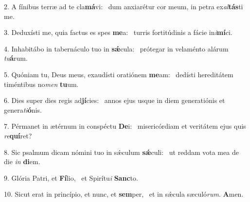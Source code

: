 2. A fínibus terræ ad te cla\textbf{má}vi: \ast\  dum anxiarétur cor meum, in petra ex\textit{al}\textbf{tás}ti me.\

3. Deduxísti me, quia factus es spes \textbf{me}a: \ast\  turris fortitúdinis a fácie in\textit{i}\textbf{mí}ci.\

4. Inhabitábo in tabernáculo tuo in \textbf{sǽ}cula: \ast\  prótegar in velaménto alárum \textit{tu}\textbf{á}rum.\

5. Quóniam tu, Deus meus, exaudísti oratiónem \textbf{me}am: \ast\  dedísti hereditátem timéntibus no\textit{men} \textbf{tu}um.\

6. Dies super dies regis ad\textbf{jí}cies: \ast\  annos ejus usque in diem generatiónis et genera\textit{ti}\textbf{ó}nis.\

7. Pérmanet in ætérnum in conspéctu \textbf{De}i: \ast\  misericórdiam et veritátem ejus quis \textit{re}\textbf{quí}ret?\

8. Sic psalmum dicam nómini tuo in sǽculum \textbf{sǽ}culi: \ast\  ut reddam vota mea de die \textit{in} \textbf{di}em.\

9. Glória Patri, et \textbf{Fí}lio, \ast\  et Spirítu\textit{i} \textbf{Sanc}to.\

10. Sicut erat in princípio, et nunc, et \textbf{sem}per, \ast\  et in sǽcula sæculó\textit{rum}. \textbf{A}men.\

